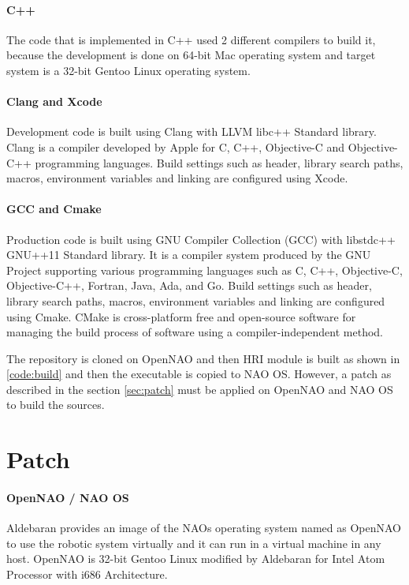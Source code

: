 \paragraph*{C++} The code that is implemented in C++ used 2 different compilers to build it, because the development is done on 64-bit Mac operating system and target system is a 32-bit Gentoo Linux operating system. 

\paragraph*{\indent Clang and Xcode} Development code is built using Clang with LLVM libc++ Standard library. Clang is a compiler developed by Apple for C, C++, Objective-C and Objective-C++ programming languages. Build settings such as header, library search paths, macros, environment variables and linking are configured using Xcode. 

\paragraph*{\indent GCC and Cmake} Production code is built using GNU Compiler Collection (GCC) with libstdc++ GNU++11 Standard library. It is a compiler system produced by the GNU Project supporting various programming languages such as C, C++, Objective-C, Objective-C++, Fortran, Java, Ada, and Go. Build settings such as header, library search paths, macros, environment variables and linking are configured using Cmake. CMake is cross-platform free and open-source software for managing the build process of software using a compiler-independent method. 

The repository is cloned on OpenNAO and then HRI module is built as shown in \ref{code:build} and then the executable is copied to NAO OS. However, a patch as described in the section \ref{sec:patch} must be applied on OpenNAO and NAO OS to build the sources.

 \label{code:build}

\section*{Patch} \label{sec:patch} 
\paragraph*{OpenNAO / NAO OS} Aldebaran provides an image of the NAOs operating system named as OpenNAO to use the robotic system virtually and it can run in a virtual machine in any host. OpenNAO is 32-bit Gentoo Linux modified by Aldebaran for Intel Atom Processor with i686 Architecture. 

